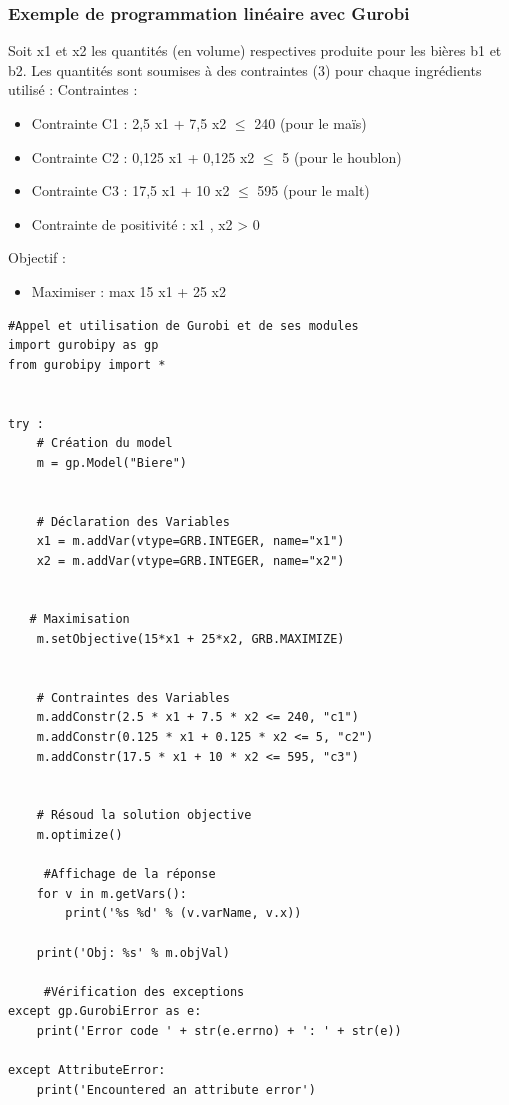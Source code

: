 \documentclass[a4paper, 12pt, twoside]{article}
\begin{document}
\subsubsection{Exemple de programmation linéaire avec Gurobi}
Soit x1 et x2 les quantités (en volume) respectives produite pour les bières b1 et b2. Les quantités sont soumises à des contraintes (3) pour chaque ingrédients utilisé : \newline \textsf{Contraintes : }
\begin{itemize} 
\item   Contrainte C1 : 2,5 x1 + 7,5 x2  $\leq$ 240 (pour le maïs)
\item   Contrainte C2 : 0,125 x1 + 0,125 x2 $\leq$ 5 (pour le houblon)
\item   Contrainte C3 : 17,5 x1 + 10 x2  $\leq$ 595 (pour le malt)
\item  Contrainte  de positivité : x1 , x2 > 0
\end{itemize}
\textsf{Objectif : }
\begin{itemize} 
\item Maximiser : max 15 x1 + 25 x2
\end{itemize}

\begin{verbatim}
#Appel et utilisation de Gurobi et de ses modules
import gurobipy as gp
from gurobipy import *


try : 
    # Création du model
    m = gp.Model("Biere")


    # Déclaration des Variables
    x1 = m.addVar(vtype=GRB.INTEGER, name="x1")
    x2 = m.addVar(vtype=GRB.INTEGER, name="x2")
   
   
   # Maximisation
    m.setObjective(15*x1 + 25*x2, GRB.MAXIMIZE)
    

    # Contraintes des Variables
    m.addConstr(2.5 * x1 + 7.5 * x2 <= 240, "c1")
    m.addConstr(0.125 * x1 + 0.125 * x2 <= 5, "c2")
    m.addConstr(17.5 * x1 + 10 * x2 <= 595, "c3")
    
   
    # Résoud la solution objective 
    m.optimize()

     #Affichage de la réponse
    for v in m.getVars():
        print('%s %d' % (v.varName, v.x))

    print('Obj: %s' % m.objVal)

     #Vérification des exceptions
except gp.GurobiError as e:
    print('Error code ' + str(e.errno) + ': ' + str(e))

except AttributeError:
    print('Encountered an attribute error')    
\end{verbatim}
\end{document}
